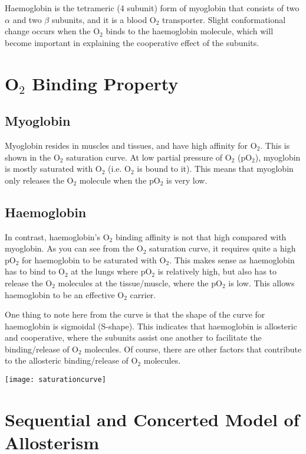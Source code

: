 \documentclass[a4paper, 12pt]{report}
\begin{document}
Haemoglobin is the tetrameric (4 subunit) form of myoglobin that consists of two $\alpha$ and two $\beta$ subunits, and it is a blood O$_2$ transporter.
Slight conformational change occurs when the O$_2$ binds to the haemoglobin molecule, which will become important in explaining the cooperative effect of the subunits.

\section{O$_2$ Binding Property}

\subsection{Myoglobin}

Myoglobin resides in muscles and tissues, and have high affinity for O$_2$.
This is shown in the O$_2$ saturation curve.
At low partial pressure of O$_2$ (pO$_2$), myoglobin is mostly saturated with O$_2$ (i.e. O$_2$ is bound to it).
This means that myoglobin only releases the O$_2$ molecule when the pO$_2$ is very low.

\subsection{Haemoglobin}

In contrast, haemoglobin's O$_2$ binding affinity is not that high compared with myoglobin.
As you can see from the O$_2$ saturation curve, it requires quite a high pO$_2$ for haemoglobin to be saturated with O$_2$.
This makes sense as haemoglobin has to bind to O$_2$ at the lungs where pO$_2$ is relatively high, but also has to release the O$_2$ molecules at the tissue/muscle, where the pO$_2$ is low.
This allows haemoglobin to be an effective O$_2$ carrier.

One thing to note here from the curve is that the shape of the curve for haemoglobin is sigmoidal (S-shape).
This indicates that haemoglobin is allosteric and cooperative, where the subunits assist one another to facilitate the binding/release of O$_2$ molecules.
Of course, there are other factors that contribute to the allosteric binding/release of O$_2$ molecules.

\begin{center}
\texttt{[image: saturationcurve]}
\end{center}

\section{Sequential and Concerted Model of \-Allosterism}
\end{document}
